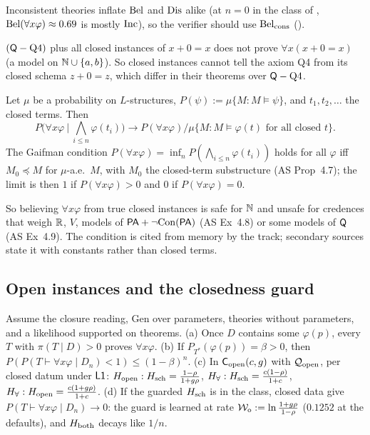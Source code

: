 \noindent Inconsistent theories inflate $\mathrm{Bel}$ and $\mathrm{Dis}$ alike (at $n=0$ in the class of , $\mathrm{Bel}(\forall x\varphi)\approx0.69$ is mostly $\mathrm{Inc}$), so the verifier should use $\mathrm{Bel}_{\mathrm{cons}}$ ().

\begin{proposition}\label{prop:univ:q4}
$(\mathsf{Q}-\text{Q4})$ plus all closed instances of $x+0=x$ does not prove $\forall x(x+0=x)$ (a model on $\mathbb{N}\cup\{a,b\}$). So closed instances cannot tell the axiom Q4 from its closed schema $z+0=z$, which differ in their theorems over $\mathsf{Q}-\text{Q4}$.
\end{proposition}

\begin{proposition}\label{prop:univ:gaifman}
Let $\mu$ be a probability on $L$-structures, $P(\psi):=\mu\{M:M\models\psi\}$, and $t_1,t_2,\dots$ the closed terms. Then
\[P\Big(\forall x\varphi\ \Big|\ \textstyle\bigwedge_{i\le n}\varphi(t_i)\Big)\to P(\forall x\varphi)\big/\mu\{M:M\models\varphi(t)\text{ for all closed }t\}.\]
The Gaifman condition \citep{gaifman1964concerning} $P(\forall x\varphi)=\inf_nP(\bigwedge_{i\le n}\varphi(t_i))$ holds for all $\varphi$ iff $M_0\preccurlyeq M$ for $\mu$-a.e.\ $M$, with $M_0$ the closed-term substructure (AS Prop~4.7); the limit is then $1$ if $P(\forall x\varphi)>0$ and $0$ if $P(\forall x\varphi)=0$.
\end{proposition}

\noindent So believing $\forall x\varphi$ from true closed instances is safe for $\mathbb{N}$ and unsafe for credences that weigh $\mathbb{R}$, $V$, models of $\mathsf{PA}+\neg\mathrm{Con}(\mathsf{PA})$ (AS Ex~4.8) or some models of $\mathsf{Q}$ (AS Ex~4.9). The condition is cited from memory by the track; secondary sources state it with constants rather than closed terms.

\subsection{Open instances and the closedness guard}\label{sec:univ:open}

\begin{proposition}\label{prop:univ:open}
Assume the closure reading, Gen over parameters, theories without parameters, and a likelihood supported on theorems. \textup{(a)} Once $D$ contains some $\varphi(p)$, every $T$ with $\pi(T\mid D)>0$ proves $\forall x\varphi$. \textup{(b)} If $P_{T^*}(\varphi(p))=\beta>0$, then $P(P(T\vdash\forall x\varphi\mid D_n)<1)\le(1-\beta)^n$. \textup{(c)} In $\mathsf{C}_{\mathrm{open}}(c,g)$ with $\mathcal{Q}_{\mathrm{open}}$, per closed datum under $\mathord{\mathsf{L1}}$: $H_{\mathrm{open}}:H_{\mathrm{sch}}=\frac{1-\rho}{1+g\rho}$, $H_{\forall}:H_{\mathrm{sch}}=\frac{c(1-\rho)}{1+c}$, $H_{\forall}:H_{\mathrm{open}}=\frac{c(1+g\rho)}{1+c}$. \textup{(d)} If the guarded $H_{\mathrm{sch}}$ is in the class, closed data give $P(T\vdash\forall x\varphi\mid D_n)\to0$: the guard is learned at rate $\mathcal{W}_{\mathrm{o}}:=\ln\frac{1+g\rho}{1-\rho}$ ($0.1252$ at the defaults), and $H_{\mathrm{both}}$ decays like $1/n$.
\end{proposition}

